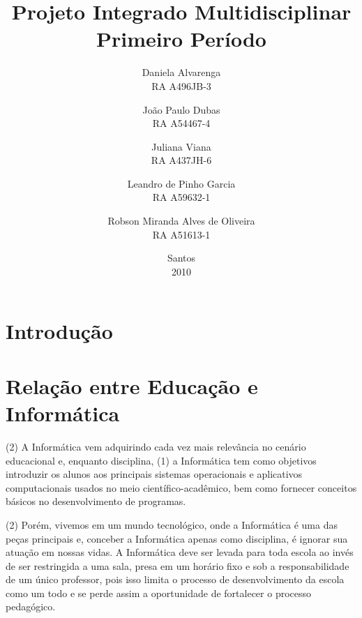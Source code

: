 \documentclass[a4paper,12pt]{report}
\begin{document}
    \author{Daniela Alvarenga                   \\RA A496JB-3
        \and João Paulo Dubas                   \\RA A54467-4
        \and Juliana Viana                      \\RA A437JH-6
        \and Leandro de Pinho Garcia            \\RA A59632-1
        \and Robson Miranda Alves de Oliveira   \\RA A51613-1}
    \title{Projeto Integrado Multidisciplinar\\Primeiro Período}
    \date{Santos\\2010}

    \maketitle

    \tableofcontents

    \chapter{Introdução}
    \label{ch:intro}

    \chapter[Educação versus Informática]{Relação entre Educação e Informática}
    \label{ch:edu_x_info}
    (2) A Informática vem adquirindo cada vez mais relevância no cenário
    educacional e, enquanto disciplina, (1) a Informática tem como objetivos
    introduzir os alunos aos principais sistemas operacionais e aplicativos
    computacionais usados no meio científico-acadêmico, bem como fornecer
    conceitos básicos no desenvolvimento de programas.

    (2) Porém, vivemos em um mundo tecnológico, onde a Informática é uma das
    peças principais e, conceber a Informática apenas como disciplina, é ignorar
    sua atuação em nossas vidas. A Informática deve ser levada para toda escola
    ao invés de ser restringida a uma sala, presa em um horário fixo e sob a
    responsabilidade de um único professor, pois isso limita o processo de
    desenvolvimento da escola como um todo e se perde assim a oportunidade de
    fortalecer o processo pedagógico.
\end{document}
